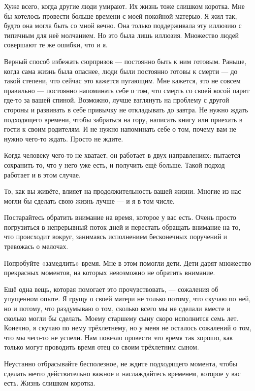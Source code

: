 \documentclass[ebook,12pt,oneside,openany]{memoir}
\begin{document}
Хуже всего, когда другие люди умирают. Их жизнь тоже слишком коротка.
Мне бы хотелось провести больше времени с моей покойной матерью. Я жил
так, будто она могла быть со мной вечно. Она только поддерживала эту
иллюзию с типичным для неё молчанием. Но это была лишь иллюзия.
Множество людей совершают те же ошибки, что и я. \newline

Верный способ избежать сюрпризов — постоянно быть к ним готовым.
Раньше, когда сама жизнь была опаснее, люди были постоянно готовы к
смерти — до такой степени, что сейчас это кажется пугающим. Мне
кажется, это не совсем правильно — постоянно напоминать себе о том,
что смерть со своей косой парит где-то за вашей спиной. Возможно,
лучше взглянуть на проблему с другой стороны и развивать в себе
привычку не откладывать до завтра. Не нужно ждать подходящего времени,
чтобы забраться на гору, написать книгу или приехать в гости к своим
родителям. И не нужно напоминать себе о том, почему вам не нужно
чего-то ждать. Просто не ждите. \newline

Когда человеку чего-то не хватает, он работает в двух направлениях:
пытается сохранить то, что у него уже есть, и получить ещё больше.
Такой подход работает и в этом случае. \newline

То, как вы живёте, влияет на продолжительность вашей жизни. Многие из
нас могли бы сделать свою жизнь лучше — и я в том числе. \newline

Постарайтесь обратить внимание на время, которое у вас есть. Очень
просто погрузиться в непрерывный поток дней и перестать обращать
внимание на то, что происходит вокруг, занимаясь исполнением
бесконечных поручений и тревожась о мелочах. \newline

Попробуйте «замедлить» время. Мне в этом помогли дети. Дети дарят
множество прекрасных моментов, на которых невозможно не обратить
внимание. \newline

Ещё одна вещь, которая помогает это прочувствовать, — сожаления об
упущенном опыте. Я грущу о своей матери не только потому, что скучаю
по ней, но и потому, что раздумываю о том, сколько всего мы не сделали
вместе и сколько могли бы сделать. Моему старшему сыну скоро
исполнится семь лет. Конечно, я скучаю по нему трёхлетнему, но у меня
не осталось сожалений о том, что мы чего-то не успели. Нам повезло
провести это время так хорошо, как только могут проводить время отец
со своим трёхлетним сыном. \newline

Неустанно отбрасывайте бесполезное, не ждите подходящего момента,
чтобы сделать нечто действительно важное и наслаждайтесь временем,
которое у вас есть. Жизнь слишком коротка. \newline
\end{document}

